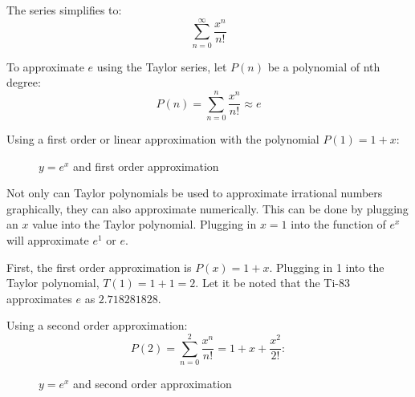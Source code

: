 \documentclass[12pt, titlepage]{article}
\begin{document}
The series simplifies to:
\begin{equation*}
  \sum_{n=0}^{\infty} \frac{x^{n}}{n!}
\end{equation*}

To approximate \(e\) using the Taylor series, let \(P(n)\) be a polynomial of nth degree:
\begin{equation*}
	P(n) = \sum_{n=0}^{n} \frac{x^{n}}{n!} \approx e
\end{equation*}

Using a first order or linear approximation with the polynomial \(P(1) = 1 + x\):
\begin{figure}[H]
\centering
    \caption[]{\(y=e^x\) and first order approximation}
\end{figure}

Not only can Taylor polynomials be used to approximate irrational numbers graphically, they can also approximate numerically. This can be done by plugging an \(x\) value into the Taylor polynomial. Plugging in \(x = 1\) into the function of \(e^x\) will  approximate \(e^1\) or \(e\). 

First, the first order approximation is \(P(x) = 1 + x\). Plugging in 1 into the Taylor polynomial, \(T(1) = 1 + 1 = 2\). Let it be noted that the Ti-83 approximates \(e\) as \(2.718281828\).

Using a second order approximation:
\begin{equation*}
  P(2) = \sum_{n=0}^{2} \dfrac{x^{n}}{n!} = 1 + x + \dfrac{x^{2}}{2!}:
\end{equation*}

\begin{figure}[H]
\centering
    \caption[]{\(y=e^x\) and second order approximation}
\end{figure}
\end{document}
